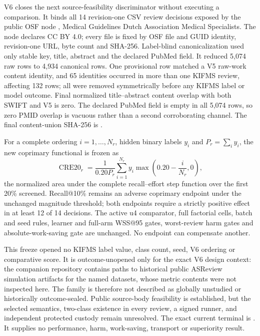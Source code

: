 V6 closes the next source-feasibility discriminator without executing a
comparison.  It binds all 14 revision-one CSV review decisions exposed by the
public OSF node , Medical Guidelines Dutch Association Medical
Specialists.  The node declares CC BY 4.0; every file is fixed by OSF file and
GUID identity, revision-one URL, byte count and SHA-256.  Label-blind
canonicalization used only stable key, title, abstract and the declared PubMed
field.  It reduced 5,074 raw rows to 4,934 canonical rows.  One provisional
row matched a V5 raw-work content identity, and 65 identities occurred in more
than one KIFMS review, affecting 132 rows; all were removed symmetrically before
any KIFMS label or model outcome.  Final normalized title--abstract content
overlap with both SWIFT and V5 is zero.  The declared PubMed field is empty in
all 5,074 rows, so zero PMID overlap is vacuous rather than a second
corroborating channel.  The final content-union SHA-256 is
.

For a complete ordering $i=1,\ldots,N_r$, hidden binary labels $y_i$ and
$P_r=\sum_i y_i$, the new coprimary functional is frozen as
\[
 \operatorname{CRE20}_r=
 \frac{1}{0.20P_r}\sum_{i=1}^{N_r}
 y_i\max\!\left(0.20-\frac{i}{N_r},0\right),
\]
the normalized area under the complete recall--effort step function over the
first 20\% screened.  Recall@10\% remains an adverse coprimary endpoint under
the unchanged magnitude threshold; both endpoints require a strictly positive
effect in at least 12 of 14 decisions.  The active u4 comparator, full
factorial cells, batch and seed rules, learner and full-arm WSS@95 gates,
worst-review harm gates and absolute-work-saving gate are unchanged.  No
endpoint can compensate another.

This freeze opened no KIFMS label value, class count, seed, V6 ordering or
comparative score.  It is outcome-unopened only for the exact V6 design
context: the companion repository contains paths to historical public ASReview
simulation artifacts for the named datasets, whose metric contents were not
inspected here.  The family is therefore not described as globally unstudied
or historically outcome-sealed.  Public source-body feasibility is established,
but the selected  semantics, two-class existence in every
review, a signed runner, and independent protected custody remain unresolved.
The exact current terminal is
.
It supplies no performance, harm, work-saving, transport or superiority result.

